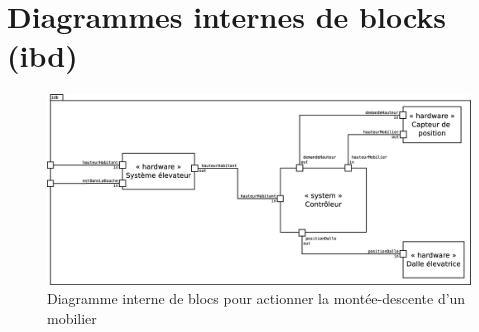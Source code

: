 \chapter{Diagrammes internes de blocks (ibd)}
\begin{figure}
	\centering
	\includegraphics[width=1\linewidth]{diagrams/bathroom/diagramme_blocks_ibd.eps}
	\caption{Diagramme interne de blocs pour actionner la montée-descente d'un mobilier}
	\label{fig:diagramme_cas_utilisation_uc}
\end{figure}
